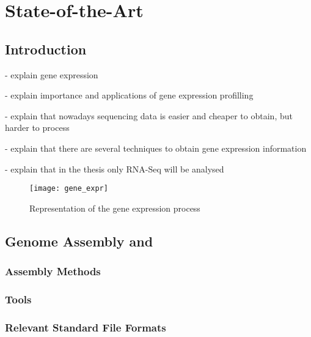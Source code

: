 \chapter{State-of-the-Art} \label{chap:sota}

\section*{}

\section{Introduction}

- explain gene expression

- explain importance and applications of gene expression profilling

- explain that nowadays sequencing data is easier and cheaper to obtain, but
  harder to process

- explain that there are several techniques to obtain gene expression
  information

- explain that in the thesis only RNA-Seq will be analysed

\begin{figure}[!htb]
  \begin{center}
    \leavevmode
    \texttt{[image: gene\_expr]}
    \caption{Representation of the gene expression process\protect\footnotemark}
    \label{fig:arch}
  \end{center}
\end{figure}

\section{Genome Assembly and \rnaseq}\label{sec:assembly}

\subsection{Assembly Methods}\label{sec:seqmethods}

\subsection{\rnaseq{} Tools}\label{sec:seqtools}

\subsection{Relevant Standard File Formats}\label{sec:formats}

